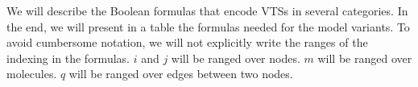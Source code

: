 
       
      
      








We will describe the Boolean formulas that encode VTSs in several categories.
%
In the end, we will present in a table the formulas needed for the
model variants.
%
To avoid cumbersome notation, we will not explicitly write the ranges of the indexing
in the formulas.
%
$i$ and $j$ will be ranged over nodes.
%
$m$ will be ranged over molecules.
%
$q$ will be ranged over edges between two nodes.
%

